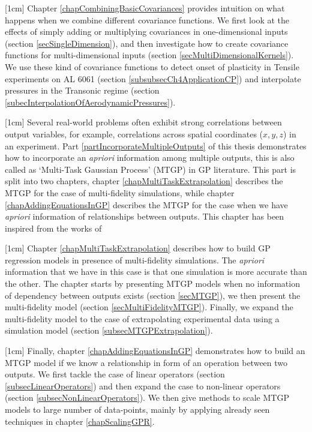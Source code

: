 [1cm]
Chapter \ref{chapCombiningBasicCovariances} provides intuition on what happens when we combine different covariance functions. We first look at the effects of simply adding or multiplying covariances in one-dimensional inputs (section \ref{secSingleDimension}), and then investigate how to create covariance functions for multi-dimensional inputs (section \ref{secMultiDimensionalKernels}). We use these kind of covariance functions to detect onset of plasticity in Tensile experiments on AL 6061 (section \ref{subsubsecCh4ApplicationCP}) and interpolate pressures in the Transonic regime (section \ref{subecInterpolationOfAerodynamicPressures}). 

[1cm]
Several real-world problems often exhibit strong correlations between output variables, for example, correlations across spatial coordinates ($x, y, z$) in an experiment. Part \ref{partIncorporateMultipleOutputs} of this thesis demonstrates how to incorporate an \textit{apriori} information among multiple outputs, this is also called as `Multi-Task Gaussian Process' (MTGP) in GP literature. This part is split into two chapters, chapter \ref{chapMultiTaskExtrapolation} describes the MTGP for the case of multi-fidelity simulations, while chapter \ref{chapAddingEquationsInGP} describes the MTGP for the case when we have \textit{apriori} information of relationships between outputs. This chapter has been inspired from the works of \cite{forrester2007multi, alvarez2011kernels, bonilla_multi-task_2008, Boyle05dependentgaussian, kennedy2000predicting, le2013multi, Constantinescu2013, journals/jmlr/AlvarezLL09, jidling2017linearly, ginsbourger2013invariances, sarkka2011linear}

[1cm]
Chapter \ref{chapMultiTaskExtrapolation} describes how to build GP regression models in presence of multi-fidelity simulations. The \textit{apriori} information that we have in this case is that one simulation is more accurate than the other. The chapter starts by presenting MTGP models when no information of dependency between outputs exists (section \ref{secMTGP}), we then present the multi-fidelity model (section \ref{secMultiFidelityMTGP}). Finally, we expand the multi-fidelity model to the case of extrapolating experimental data using a simulation model (section \ref{subsecMTGPExtrapolation}). 

[1cm]
Finally, chapter \ref{chapAddingEquationsInGP} demonstrates how to build an MTGP model if we know a relationship in form of an operation between two outputs. We first tackle the case of linear operators (section \ref{subsecLinearOperators}) and then expand the case to non-linear operators (section \ref{subsecNonLinearOperators}). We then give methods to scale MTGP models to large number of data-points, mainly by applying already seen techniques in chapter \ref{chapScalingGPR}. 

